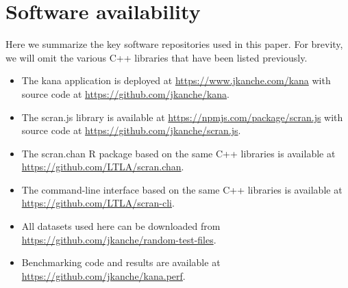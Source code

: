 \documentclass{article}
\begin{document}
\section{Software availability}

Here we summarize the key software repositories used in this paper.
For brevity, we will omit the various C++ libraries that have been listed previously.

\begin{itemize}
\item The kana application is deployed at \url{https://www.jkanche.com/kana} with source code at \url{https://github.com/jkanche/kana}.
\item The scran.js library is available at \url{https://npmjs.com/package/scran.js} with source code at \url{https://github.com/jkanche/scran.js}.
\item The scran.chan R package based on the same C++ libraries is available at \url{https://github.com/LTLA/scran.chan}.
\item The command-line interface based on the same C++ libraries is available at \url{https://github.com/LTLA/scran-cli}.
\item All datasets used here can be downloaded from \url{https://github.com/jkanche/random-test-files}.
\item Benchmarking code and results are available at \url{https://github.com/jkanche/kana.perf}.
\end{itemize}



\end{document}

